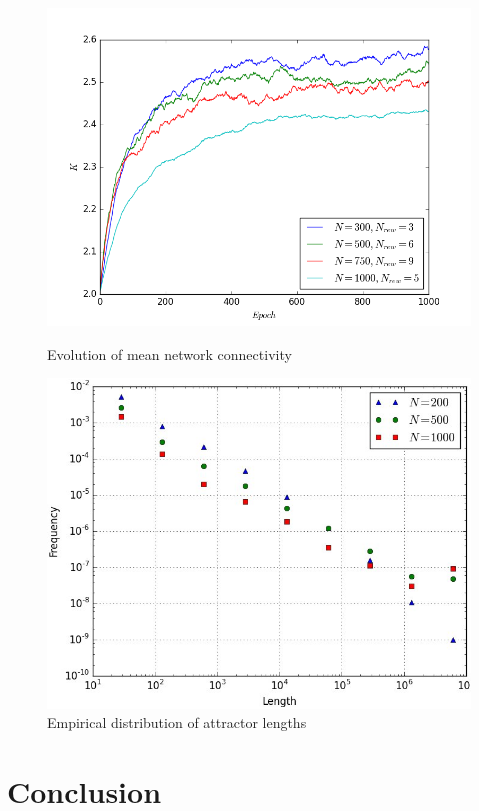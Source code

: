 \documentclass[procedia]{easychair}
\begin{document}
	\begin{figure}[ht!]
		\begin{minipage}[t]{0.45\textwidth}
			\includegraphics[width=1.0\textwidth]{plots/evolution}
			\caption{Evolution of mean network connectivity}
		\end{minipage}\hfill
		\begin{minipage}[t]{0.45\textwidth}
			\centering
			\includegraphics[width=1.0\textwidth]{plots/attractors}
			\caption{Empirical distribution of attractor lengths}
		\end{minipage}
	\end{figure}
	
	\clearpage
	\section{Conclusion}
	\label{sect:conclusion}
	
	\label{sect:bib}
	
	
\end{document}
